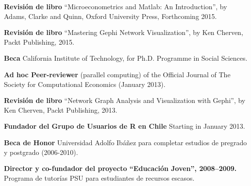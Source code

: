 \documentclass[letterpaper, 11pt]{article}
\def\footerlink{http://its.caltech.edu/$\sim$gvegayon}
\renewenvironment{itemize}{
  \begin{list}{}{
    \setlength{\leftmargin}{0.45cm}
  }
}{
  \end{list}
}
\begin{document}
\begin{itemize}
\item \textbf{Revisi\'on de libro} ``Microeconometrics and Matlab: An Introduction'', by Adams, Clarke and Quinn, Oxford University Press, Forthcoming 2015.
\item \textbf{Revisi\'on de libro} ``Mastering Gephi Network Visualization'', by Ken Cherven, Packt Publishing, 2015.
\item \textbf{Beca} California Institute of Technology, for Ph.D. Programme in Social Sciences.
\item \textbf{Ad hoc Peer-reviewer} (parallel computing) of the Official Journal of The Society for Computational Economics (January 2013).
\item \textbf{Revisi\'on de libro} ``Network Graph Analysis and Visualization with Gephi'', by Ken Cherven, Packt Publishing, 2013.
\item \textbf{Fundador del Grupo de Usuarios de R en Chile} Starting in January 2013.
\item \textbf{Beca de Honor} Universidad Adolfo Ib\'a\~nez para completar estudios de pregrado y postgrado (2006-2010).
\item \textbf{Director y co-fundador del proyecto ``Educaci\'on Joven'', 2008--2009.} Programa de tutor\'ias PSU para estudiantes de recursos escasos.
\end{itemize}


\end{document}
